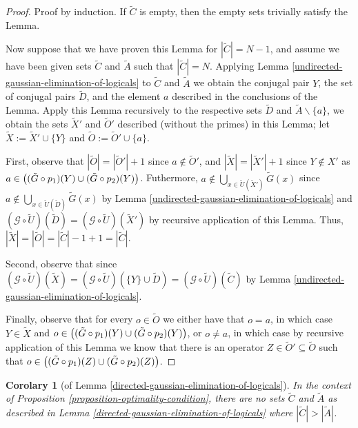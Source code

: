 \documentclass[twocolumn,showpacs,preprintnumbers,amsmath,amssymb,nofootinbib,pra,floatfix]{revtex4-1}
\newtheorem{corolary}{Corolary}
\newcommand{\set}{\tilde}
\newcommand{\genfun}{\mathcal{G}}
\begin{document}
\begin{proof}
Proof by induction.  If $\set C$ is empty, then the empty sets trivially satisfy the Lemma.

Now suppose that we have proven this Lemma for $|\set C|=N-1$, and assume we have been given sets $\set C$ and $\set A$ such that $|\set C|=N$.  Applying Lemma \ref{undirected-gaussian-elimination-of-logicals} to $\set C$ and $\set A$ we obtain the conjugal pair $Y$,  the set of conjugal pairs $\set D$, and the element $a$ described in the conclusions of the Lemma.  Apply this Lemma recursively to the respective sets $\set D$ and $\set A\backslash\{a\}$, we obtain the sets $\set X'$ and $\set O'$ described (without the primes) in this Lemma; let $\set X := \set X'\cup\{Y\}$ and $\set O:=\set O'\cup\{a\}$.

First, observe that $|\set O|=|\set O'|+1$ since $a\notin \set O'$, and $|\set X|=|\set X'|+1$ since $Y\notin X'$ as $a\in\paren{(\set G\circ p_1)(Y)\cup(\set G\circ p_2)(Y)}$.  Futhermore, $a\notin \bigcup_{x\in \set U(\set X')} \set G(x)$ since $a\notin \bigcup_{x\in \set U(\set D)} \set G(x)$ by Lemma \ref{undirected-gaussian-elimination-of-logicals} and $(\genfun\circ\set U)(\set D)=(\genfun\circ\set U)(\set X')$ by recursive application of this Lemma.  Thus, $|\set X|=|\set O|=|\set C|-1+1=|\set C|$.

Second, observe that since $(\genfun\circ\set U)(\set X)=(\genfun\circ\set U)(\{Y\}\cup \set D)=(\genfun\circ\set U)(\set C)$ by Lemma \ref{undirected-gaussian-elimination-of-logicals}.

Finally, observe that for every $o\in\set O$ we either have that $o=a$, in which case $Y\in\set X$ and $o\in\paren{(\set G\circ p_1)(Y)\cup(\set G\circ p_2)(Y)}$, or $o\ne a$, in which case by recursive application of this Lemma we know that there is an operator $Z\in \set O'\subseteq \set O$ such that $o\in\paren{(\set G\circ p_1)(Z)\cup(\set G\circ p_2)(Z)}$.
\end{proof}
\begin{corolary}[of Lemma \ref{directed-gaussian-elimination-of-logicals}]
In the context of Proposition \ref{proposition-optimality-condition}, there are no sets $\set C$ and $\set A$ as described in Lemma \ref{directed-gaussian-elimination-of-logicals} where $|\set C|>|\set A|$.
\end{corolary}
\end{document}
